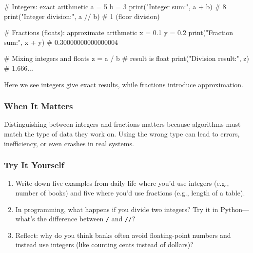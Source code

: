 \documentclass[
  letterpaper,
  DIV=11,
  numbers=noendperiod]{scrreprt}
\newenvironment{Shaded}{\begin{snugshade}}{\end{snugshade}}
\newcommand{\BuiltInTok}[1]{\textcolor[rgb]{0.00,0.23,0.31}{#1}}
\newcommand{\CommentTok}[1]{\textcolor[rgb]{0.37,0.37,0.37}{#1}}
\newcommand{\DecValTok}[1]{\textcolor[rgb]{0.68,0.00,0.00}{#1}}
\newcommand{\FloatTok}[1]{\textcolor[rgb]{0.68,0.00,0.00}{#1}}
\newcommand{\NormalTok}[1]{\textcolor[rgb]{0.00,0.23,0.31}{#1}}
\newcommand{\OperatorTok}[1]{\textcolor[rgb]{0.37,0.37,0.37}{#1}}
\newcommand{\StringTok}[1]{\textcolor[rgb]{0.13,0.47,0.30}{#1}}
\providecommand{\tightlist}{%
  \setlength{\itemsep}{0pt}\setlength{\parskip}{0pt}}
\begin{document}
\begin{Shaded}
\begin{Highlighting}[]
\CommentTok{\# Integers: exact arithmetic}
\NormalTok{a }\OperatorTok{=} \DecValTok{5}
\NormalTok{b }\OperatorTok{=} \DecValTok{3}
\BuiltInTok{print}\NormalTok{(}\StringTok{"Integer sum:"}\NormalTok{, a }\OperatorTok{+}\NormalTok{ b)     }\CommentTok{\# 8}
\BuiltInTok{print}\NormalTok{(}\StringTok{"Integer division:"}\NormalTok{, a }\OperatorTok{//}\NormalTok{ b)  }\CommentTok{\# 1 (floor division)}

\CommentTok{\# Fractions (floats): approximate arithmetic}
\NormalTok{x }\OperatorTok{=} \FloatTok{0.1}
\NormalTok{y }\OperatorTok{=} \FloatTok{0.2}
\BuiltInTok{print}\NormalTok{(}\StringTok{"Fraction sum:"}\NormalTok{, x }\OperatorTok{+}\NormalTok{ y)   }\CommentTok{\# 0.30000000000000004}

\CommentTok{\# Mixing integers and floats}
\NormalTok{z }\OperatorTok{=}\NormalTok{ a }\OperatorTok{/}\NormalTok{ b   }\CommentTok{\# result is float}
\BuiltInTok{print}\NormalTok{(}\StringTok{"Division result:"}\NormalTok{, z)    }\CommentTok{\# 1.666...}
\end{Highlighting}
\end{Shaded}

Here we see integers give exact results, while fractions introduce
approximation.

\subsubsection{When It Matters}\label{when-it-matters-48}

Distinguishing between integers and fractions matters because algorithms
must match the type of data they work on. Using the wrong type can lead
to errors, inefficiency, or even crashes in real systems.

\subsubsection{Try It Yourself}\label{try-it-yourself-50}

\begin{enumerate}
\def\labelenumi{\arabic{enumi}.}
\tightlist
\item
  Write down five examples from daily life where you'd use integers
  (e.g., number of books) and five where you'd use fractions (e.g.,
  length of a table).
\item
  In programming, what happens if you divide two integers? Try it in
  Python---what's the difference between \texttt{/} and \texttt{//}?
\item
  Reflect: why do you think banks often avoid floating-point numbers and
  instead use integers (like counting cents instead of dollars)?
\end{enumerate}
\end{document}

